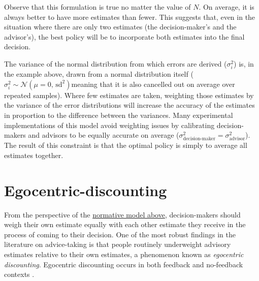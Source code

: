 \documentclass[a4paper, nobind]{templates/ociamthesis}
\begin{document}
Observe that this formulation is true no matter the value of \(N\). On average, it is always better to have more estimates than fewer. This suggests that, even in the situation where there are only two estimates (the decision-maker's and the advisor's), the best policy will be to incorporate both estimates into the final decision.

The variance of the normal distribution from which errors are derived (\(\sigma^{2}_{i}\)) is, in the example above, drawn from a normal distribution itself (\(\sigma^{2}_{i} \sim \mathcal{N}(\mu=0,\,\text{sd}^{2})\)meaning that it is also cancelled out on average over repeated samples). Where few estimates are taken, weighting those estimates by the variance of the error distributions will increase the accuracy of the estimates in proportion to the difference between the variances. Many experimental implementations of this model avoid weighting issues by calibrating decision-makers and advisors to be equally accurate on average (\(\sigma^{2}_{\text{decision-maker}}=\sigma^{2}_{\text{advisor}}\)). The result of this constraint is that the optimal policy is simply to average all estimates together.

\hypertarget{egocentric-discounting}{%
\section*{Egocentric-discounting}\label{egocentric-discounting}}

From the perspective of the \protect\hyperlink{normative-models-of-advice-taking}{normative model above}, decision-makers should weigh their own estimate equally with each other estimate they receive in the process of coming to their decision. One of the most robust findings in the literature on advice-taking is that people routinely underweight advisory estimates relative to their own estimates, a phenomenon known as \emph{egocentric discounting}\autocite{danaAdviceChoice2015,ginoEffectsTaskDifficulty2007,hutterSeekingAdviceSampling2016,libermanNaiveRealismCapturing2012,minsonCostCollaborationWhy2012,raderAdviceFormSocial2017,ronayneIgnoringGoodAdvice2018,seeDetrimentalEffectsPower2011,sollJudgmentalAggregationStrategies2011,troucheVigilantConservatismEvaluating2018,yanivAdviceTakingDecision2000,yanivExploitingWisdomOthers2012,yanivUsingAdviceMultiple2007}. Egocentric discounting occurs in both feedback and no-feedback contexts \autocite{yanivAdviceTakingDecision2000}.
\end{document}
